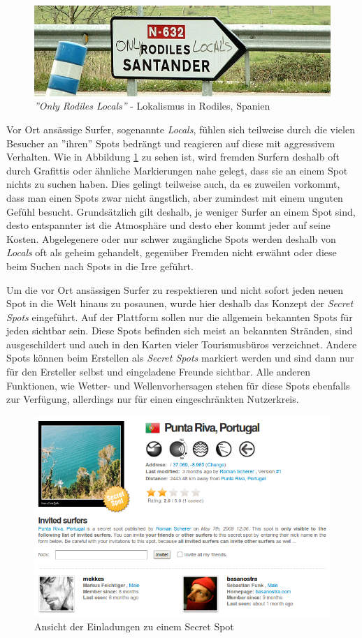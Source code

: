 \begin{figure}[h]
  \includegraphics[width=\textwidth]{bilder/locals-only}
  \caption{\textit{''Only Rodiles Locals''} - Lokalismus in Rodiles,
    Spanien}
  \label{locals-only}
\end{figure}

Vor Ort ansässige Surfer, sogenannte \textit{Locals}, fühlen sich
teilweise durch die vielen Besucher an ''ihren'' Spots bedrängt und
reagieren auf diese mit aggressivem Verhalten. Wie in Abbildung
\ref{locals-only} zu sehen ist, wird fremden Surfern deshalb oft durch
Grafittis oder ähnliche Markierungen nahe gelegt, dass sie an einem
Spot nichts zu suchen haben. Dies gelingt teilweise auch, da es
zuweilen vorkommt, dass man einen Spots zwar nicht ängstlich, aber
zumindest mit einem unguten Gefühl besucht. Grundsätzlich gilt
deshalb, je weniger Surfer an einem Spot sind, desto entspannter ist
die Atmosphäre und desto eher kommt jeder auf seine
Kosten. Abgelegenere oder nur schwer zugängliche Spots werden deshalb
von \textit{Locals} oft als geheim gehandelt, gegenüber Fremden nicht
erwähnt oder diese beim Suchen nach Spots in die Irre geführt.

Um die vor Ort ansässigen Surfer zu respektieren und nicht sofort
jeden neuen Spot in die Welt hinaus zu posaunen, wurde hier deshalb
das Konzept der \textit{Secret Spots} eingeführt. Auf der Plattform
sollen nur die allgemein bekannten Spots für jeden sichtbar
sein. Diese Spots befinden sich meist an bekannten Stränden, sind
ausgeschildert und auch in den Karten vieler Tourismusbüros
verzeichnet. Andere Spots können beim Erstellen als \textit{Secret
  Spots} markiert werden und sind dann nur für den Ersteller selbst
und eingeladene Freunde sichtbar. Alle anderen Funktionen, wie Wetter-
und Wellenvorhersagen stehen für diese Spots ebenfalls zur Verfügung,
allerdings nur für einen eingeschränkten Nutzerkreis.

\begin{figure}[t]
 \includegraphics[width=\textwidth]{bilder/secret-spot}
 \caption{Ansicht der Einladungen zu einem Secret Spot}
 \label{secret-spot}
\end{figure}

